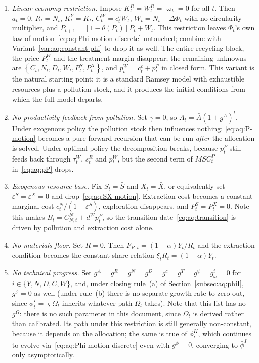 \begin{enumerate}[label=\textbf{V\arabic*.},leftmargin=3.2em,itemsep=0.4em]

\item\label{var:aq:linear} \emph{Linear-economy restriction.} Impose $K^R_t=W^R_t=\varpi_t=0$ for all $t$. Then $a_t=0$, $R_t=N_t$, $K^Y_t=K_t$, $C^W_t=c^c_tW_t$, $W_t=N_t-\Delta\Phi_t$ with no circularity multiplier, and $P_{t+1}=\left[1-\theta(P_t)\right]P_t+W_t$. This restriction leaves $\Phi_t$'s own law of motion~\eqref{eq:aq:Phi-motion-discrete} untouched; combine with Variant~\ref{var:aq:constant-phi} to drop it as well. The entire recycling block, the price $P^W_t$ and the treatment margin disappear; the remaining unknowns are $\left\{C_t,N_t,D_t,W_t,P^S_t,P^X_t\right\}$, and $p^W_t=c^c_t+p^P_t$ in closed form. This variant is the natural starting point: it is a standard Ramsey model with exhaustible resources plus a pollution stock, and it produces the initial conditions from which the full model departs.

\item\label{var:aq:no-feedback} \emph{No productivity feedback from pollution.} Set $\gamma=0$, so $A_t=\bar A\left(1+g^A\right)^t$. Under exogenous policy the pollution stock then influences nothing: \eqref{eq:aq:P-motion} becomes a pure forward recursion that can be run \emph{after} the allocation is solved. Under optimal policy the decomposition breaks, because $p^P_t$ still feeds back through $\tau^W_t$, $s^R_t$ and $p^W_t$, but the second term of $MSC^P_t$ in~\eqref{eq:aq:pP} drops.

\item\label{var:aq:no-resource} \emph{Exogenous resource base.} Fix $S_t=\bar S$ and $X_t=\bar X$, or equivalently set $\varepsilon^S=\varepsilon^X=0$ and drop~\eqref{eq:aq:SX-motion}. Extraction cost becomes a constant marginal cost $c^N_t/\left(1+\varepsilon^S\right)$, exploration disappears, and $P^S_t=P^X_t=0$. Note this makes $B_t=C^N_{N,t}+d^Wp^P_t$, so the transition date~\eqref{eq:aq:transition} is driven by pollution and extraction cost alone.

\item\label{var:aq:no-floor} \emph{No materials floor.} Set $\bar R=0$. Then $F_{R,t}=(1-\alpha)Y_t/R_t$ and the extraction condition becomes the constant-share relation $\xi_tR_t=(1-\alpha)Y_t$.

\item\label{var:aq:no-progress} \emph{No technical progress.} Set $g^A=g^R=g^N=g^D=g^c=g^T=g^\psi=g^i_\omega=0$ for $i\in\{Y,N,D,C,W\}$, and, under closing rule~(a) of Section~\ref{subsec:aq:phiI}, $g^\phi=0$ as well (under rule~(b) there is no separate growth rate to zero out, since $\phi^I_t=\varsigma\Omega_t$ inherits whatever path $\Omega_t$ takes). Note that this list has no $g^\Omega$: there is no such parameter in this document, since $\Omega_t$ is derived rather than calibrated. Its path under this restriction is still generally non-constant, because it depends on the allocation; the same is true of $\phi^K_t$, which continues to evolve via~\eqref{eq:aq:Phi-motion-discrete} even with $g^\phi=0$, converging to $\bar\phi^I$ only asymptotically.


\end{enumerate}

